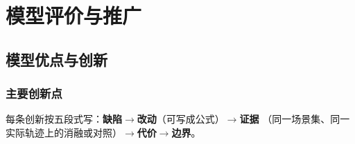 
\section{模型评价与推广}\label{chap:eval}

\subsection{模型优点与创新}

\subsubsection{主要创新点}

每条创新按五段式写：\textbf{缺陷}\(\rightarrow\)\textbf{改动}（可写成公式）\(\rightarrow\)\textbf{证据}
（同一场景集、同一实际轨迹上的消融或对照）\(\rightarrow\)\textbf{代价}\(\rightarrow\)\textbf{边界}。

